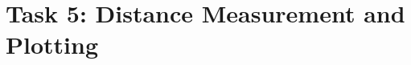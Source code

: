 \documentclass[15pt, a4paper, oneside]{report}
\begin{document}
\normalfont

\vspace*{5mm}

\section*{\Large Task 5: Distance Measurement and Plotting}

\vspace{2mm}
    \Large
   
    
    
    
    
    

  
\vspace{1cm}
\end{document}
